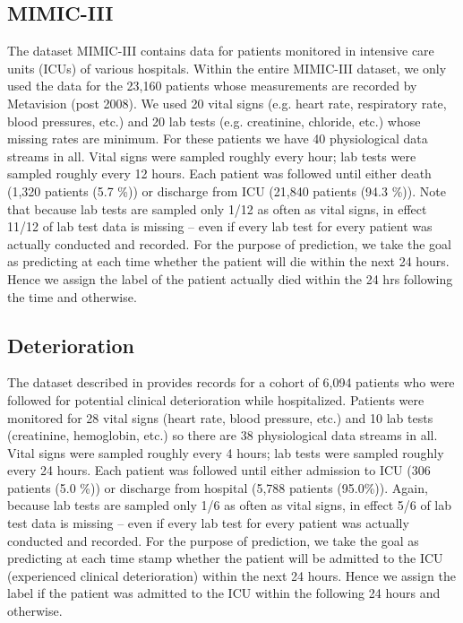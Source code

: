 \documentclass{article}
\begin{document}
	\subsection{MIMIC-III} The dataset MIMIC-III \cite{MIMIC} contains data for patients monitored in intensive care units (ICUs) of various hospitals. Within the entire MIMIC-III dataset, we only used the data for the 23,160 patients whose measurements are recorded by Metavision (post 2008). We used 20 vital signs (e.g. heart rate, respiratory rate, blood pressures, etc.) and 20 lab tests (e.g. creatinine, chloride, etc.) whose missing rates are minimum. For these patients we have 40 physiological data streams in all. Vital signs were sampled roughly every hour; lab tests were sampled roughly every 12 hours. Each patient was followed until either death (1,320 patients (5.7 \%)) or discharge from ICU (21,840 patients (94.3 \%)). Note that because lab tests are sampled only 1/12 as often as vital signs, in effect 11/12 of lab test data is missing -- even if every lab test for every patient was actually conducted and recorded. For the purpose of prediction, we take the goal as predicting at each time  whether the patient will die within the next 24 hours.  Hence we assign the label  of the patient actually died within the 24 hrs following the time  and   otherwise.
	
	\subsection{Deterioration} The dataset described in \cite{TBME} provides records for a cohort of 6,094 patients who were followed for potential clinical deterioration while hospitalized. Patients were monitored for 28 vital signs (heart rate, blood pressure, etc.) and 10 lab tests (creatinine, hemoglobin, etc.) so there are 38 physiological data streams in all. Vital signs were sampled roughly every 4 hours; lab tests were sampled roughly every 24 hours. Each patient was followed until either admission to ICU (306 patients (5.0 \%)) or discharge from hospital (5,788 patients (95.0\%)). Again, because lab tests are sampled only 1/6 as often as vital signs, in effect 5/6 of lab test data is missing -- even if every lab test for every patient was actually conducted and recorded. For the purpose of prediction, we take the goal as predicting at each time stamp  whether the patient will be admitted to the ICU (experienced clinical deterioration) within the next 24 hours.  Hence we assign the label  if the patient was admitted to the ICU within the following 24 hours and  otherwise.
		
\end{document}
